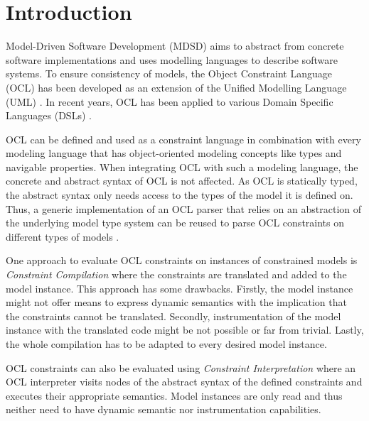 \section{Introduction}

	Model-Driven Software Development (MDSD) aims to abstract from concrete 
	software implementations and uses modelling languages to describe 
	software systems. To ensure consistency of models, the Object Constraint Language 
	(OCL) \cite{spec:OCL2-2} has been developed as an extension of the Unified 
	Modelling Language (UML) \cite{spec:UML2-2}. In recent years, OCL has been 
	applied to various 
	Domain Specific Languages (DSLs) \cite{oclExample:DSL}. 

	OCL can be
	defined and used as a constraint language in combination
	with every modeling language that has 
	object-oriented modeling concepts like types and navigable properties.
	When integrating OCL with such a modeling language, the concrete and 
	abstract syntax of OCL is not affected. As OCL is statically
	typed, the abstract syntax only needs access to the types of the model 
	it is defined on. Thus, a generic implementation of an OCL parser
	that relies on an abstraction of the underlying model type system can be
	reused to parse OCL constraints on different types of
	models \cite{braeuerOCL07}.

	One approach to evaluate OCL constraints on instances 
	of constrained models is \textit{Constraint Compilation} where the constraints are 
	translated and added to the model instance. This approach has some drawbacks. 
	Firstly, the model instance might not offer means to express dynamic semantics with 
	the implication that the constraints cannot be translated. Secondly, 
	instrumentation of the model instance with the translated code might be not possible 
	or far from trivial. Lastly, the whole compilation has to be 	adapted to every desired model 
	instance.
	
	OCL constraints can also be evaluated using \textit{Constraint Interpretation} where 
	an OCL interpreter visits nodes of the abstract syntax of the defined constraints and 
	executes their appropriate semantics. Model instances are only read and thus neither 
	need to have dynamic semantic nor instrumentation capabilities.
	
